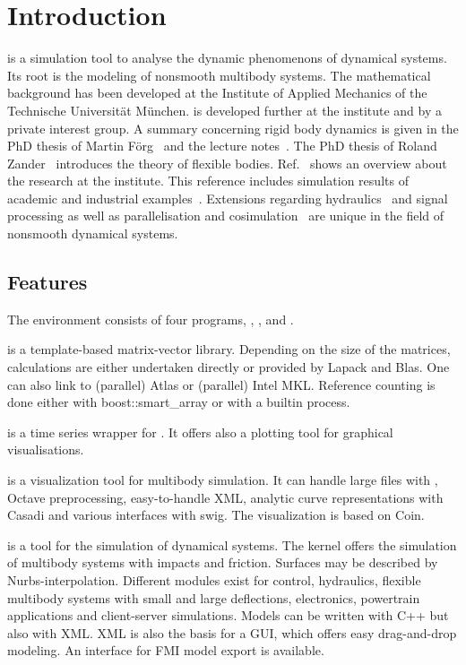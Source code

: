 \section{Introduction}
\MBSim{} is a simulation tool to analyse the dynamic phenomenons of dynamical systems. Its root is the modeling of nonsmooth multibody systems. The mathematical background has been developed at the Institute of Applied Mechanics of the Technische Universit\"at M\"unchen. \MBSim{} is developed further at the institute and by a private interest group. A summary concerning rigid body dynamics is given in the PhD thesis of Martin F\"org~\cite{Foer07} and the lecture notes~\cite{Sch14c}. The PhD thesis of Roland Zander~\cite{Zan09} introduces the theory of flexible bodies. Ref.~\cite{Zan08} shows an overview about the research at the institute. This reference includes simulation results of academic and industrial examples~\cite{Ceb14,Gru15,Sch10}. Extensions regarding hydraulics~\cite{Sch12g} and signal processing as well as parallelisation and cosimulation~\cite{Fri11,Cla13} are unique in the field of nonsmooth dynamical systems.
%
\subsection{Features}
The \MBSim{} environment consists of four programs, \MBSim{}, \OpenMBV{}, \HDFSerie{} and \FMatVec{}.\par
%
\FMatVec{} is a template-based matrix-vector library. Depending on the size of the matrices, calculations are either undertaken directly or provided by Lapack and Blas. One can also link to (parallel) Atlas or (parallel) Intel MKL. Reference counting is done either with boost::smart\_array or with a builtin process.\par
%
\HDFSerie{} is a time series wrapper for \HDF. It offers also a plotting tool for graphical visualisations.\par
%
\OpenMBV{} is a visualization tool for multibody simulation. It can handle large files with \HDF, Octave preprocessing, easy-to-handle XML, analytic curve representations with Casadi and various interfaces with swig. The visualization is based on Coin.\par
%
\MBSim{} is a tool for the simulation of dynamical systems. The kernel offers the simulation of multibody systems with impacts and friction. Surfaces may be described by Nurbs-interpolation. Different modules exist for control, hydraulics, flexible multibody systems with small and large deflections, electronics, powertrain applications and client-server simulations. Models can be written with C++ but also with XML. XML is also the basis for a GUI, which offers easy drag-and-drop modeling. An interface for FMI model export is available.
%
